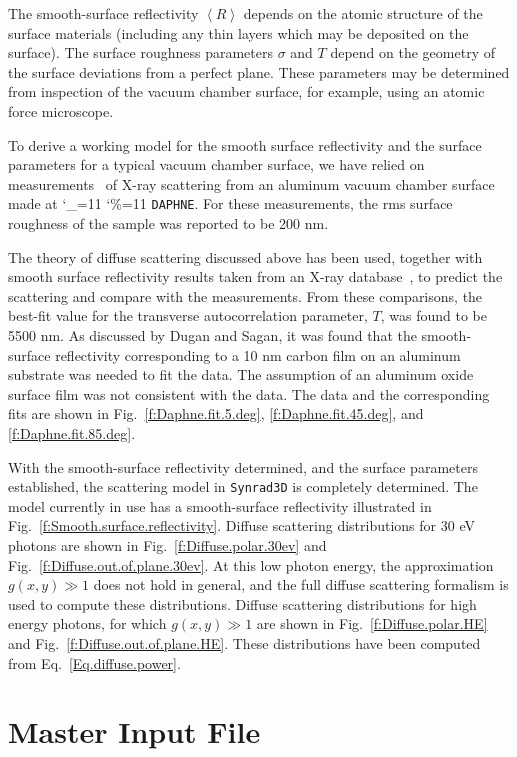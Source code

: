 \documentclass[11pt,openany]{report}
\newcommand{\srthree}{\texttt{Synrad3D}\xspace}
\newcommand\ttcmd{\begingroup\catcode`\_=11 \catcode`\%=11 \dottcmd}
\newcommand\dottcmd[1]{\texttt{#1}\endgroup}
\newcommand{\vn}{\ttcmd}
\begin{document}
The smooth-surface reflectivity $\left<R\right>$ depends on the atomic
structure of the surface materials (including any thin layers which
may be deposited on the surface). The surface roughness parameters
$\sigma$ and $T$ depend on the geometry of the surface deviations from
a perfect plane. These parameters may be determined from inspection of
the vacuum chamber surface, for example, using an atomic force
microscope.

To derive a working model for the smooth surface reflectivity and the
surface parameters for a typical vacuum chamber surface, we have
relied on measurements~\cite{b:mehne} of X-ray scattering
from an aluminum vacuum chamber surface made at \vn{DAPHNE}. For
these measurements, the rms surface roughness of the sample was
reported to be 200 nm.

The theory of diffuse scattering discussed above has been used,
together with smooth surface reflectivity results taken from an X-ray
database~\cite{b:henke}, to predict the scattering and compare with
the measurements. From these comparisons, the best-fit value for the
transverse autocorrelation parameter, $T$, was found to be 5500 nm. As
discussed by Dugan and Sagan\cite{b:synrad3d},
it was found that the smooth-surface reflectivity
corresponding to a 10 nm carbon film on an aluminum substrate was
needed to fit the data. The assumption of an aluminum oxide surface
film was not consistent with the data. The data and the corresponding
fits are shown in Fig.~\ref{f:Daphne.fit.5.deg},
\ref{f:Daphne.fit.45.deg}, and \ref{f:Daphne.fit.85.deg}.

With the smooth-surface reflectivity determined, and the surface
parameters established, the scattering model in \srthree is
completely determined. The model currently in use has a smooth-surface
reflectivity illustrated in
Fig.~\ref{f:Smooth.surface.reflectivity}. Diffuse
scattering distributions for 30 eV photons are shown in
Fig.~\ref{f:Diffuse.polar.30ev} and
Fig.~\ref{f:Diffuse.out.of.plane.30ev}. At this low photon
energy, the approximation $g(x,y)\gg 1$ does not hold in general, and
the full diffuse scattering formalism is used to compute these
distributions. Diffuse scattering distributions for high energy
photons, for which $g(x,y)\gg 1$ are shown in
Fig.~\ref{f:Diffuse.polar.HE} and
Fig.~\ref{f:Diffuse.out.of.plane.HE}. These distributions
have been computed from Eq.~\ref{Eq.diffuse.power}.

\chapter{Master Input File} 
\label{s:master}
\end{document}
